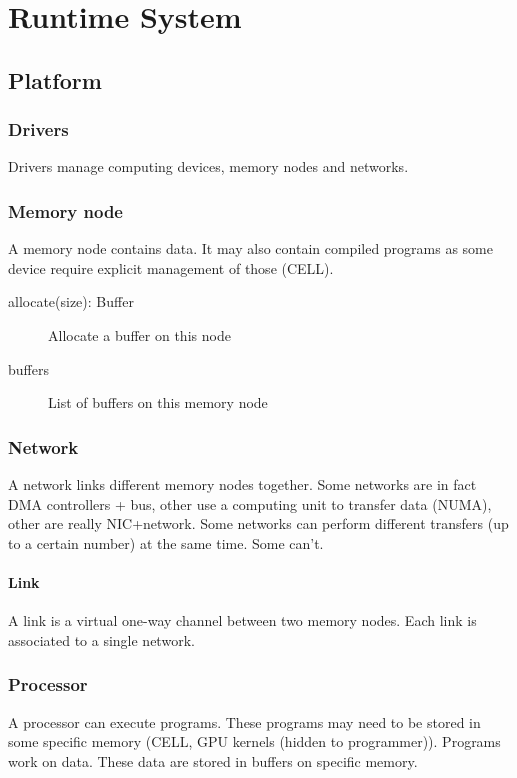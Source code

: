 \chapter{Runtime System}

\section{Platform}

\subsection{Drivers}
Drivers manage computing devices, memory nodes and networks.


\subsection{Memory node}
A memory node contains data.
It may also contain compiled programs as some device require explicit management of those (CELL).

\begin{description}
  \item[allocate(size): Buffer] Allocate a buffer on this node
  \item[buffers] List of buffers on this memory node
\end{description}

\subsection{Network}
A network links different memory nodes together.
Some networks are in fact DMA controllers + bus, other use a computing unit to transfer data (NUMA), other are really NIC+network. 
Some networks can perform different transfers (up to a certain number) at the same time. Some can't.


\subsubsection{Link}
A link is a virtual one-way channel between two memory nodes. Each link is associated to a single network.


\subsection{Processor}
A processor can execute programs. These programs may need to be stored in some specific memory (CELL, GPU kernels (hidden to programmer)).
Programs work on data. These data are stored in buffers on specific memory.


